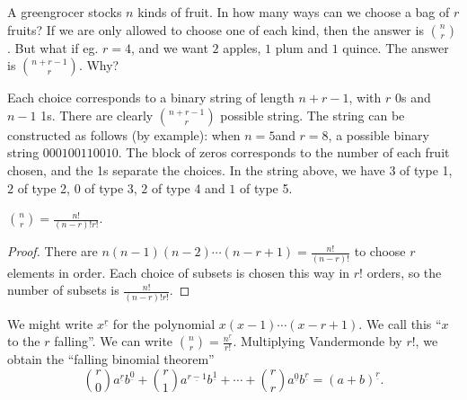 \documentclass[a4paper]{article}
\begin{document}
  \begin{eg}
    A greengrocer stocks $n$ kinds of fruit. In how many ways can we choose a bag of $r$ fruits? If we are only allowed to choose one of each kind, then the answer is $\binom{n}{r}$. But what if eg. $r = 4$, and we want $2$ apples, $1$ plum and $1$ quince. The answer is $\binom{n + r - 1}{r}$. Why?

    Each choice corresponds to a binary string of length $n + r - 1$, with $r$ 0s and $n - 1$ 1s. There are clearly $\binom{n + r - 1}{r}$ possible string. The string can be constructed as follows (by example): when $n = 5$and $r=8$, a possible binary string $000100110010$. The block of zeros corresponds to the number of each fruit chosen, and the 1s separate the choices. In the string above, we have $3$ of type 1, $2$ of type 2, $0$ of type 3, $2$ of type 4 and $1$ of type 5.
  \end{eg}

  \begin{prop}
    $\displaystyle\binom{n}{r} = \frac{n!}{(n - r)!r!}$.
  \end{prop}

  \begin{proof}
    There are $n(n - 1)(n - 2)\cdots (n - r + 1) = \frac{n!}{(n - r)!}$ to choose $r$ elements in order. Each choice of subsets is chosen this way in $r!$ orders, so the number of subsets is $\frac{n!}{(n - r)!r!}$.
  \end{proof}

  We might write $x^{\underline{r}}$ for the polynomial $x(x - 1)\cdots (x - r + 1)$. We call this ``$x$ to the $r$ falling''. We can write $\displaystyle \binom{n}{r} = \frac{n^{\underline{r}}}{r!}$. Multiplying Vandermonde by $r!$, we obtain the ``falling binomial theorem''
  \[
    \binom{r}{0}a^{\underline{r}}b^{\underline{0}} + \binom{r}{1}a^{\underline{r - 1}}b^{\underline{1}} + \cdots + \binom{r}{r}a^{\underline{0}}b^{\underline{r}} = (a + b)^{\underline{r}}.
  \]
\end{document}
